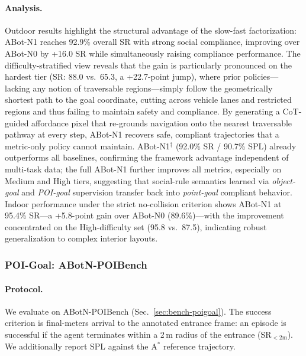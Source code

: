 \paragraph{Analysis.}
Outdoor results highlight the structural advantage of the
slow-fast factorization: ABot-N1 reaches 92.9\% overall SR with
strong social compliance, improving over ABot-N0
by +16.0 SR while simultaneously raising compliance performance.
The difficulty-stratified view reveals that the gain is particularly
pronounced on the hardest tier (SR: 88.0 vs.\ 65.3, a +22.7-point
jump), where prior policies---lacking any notion of traversable
regions---simply follow the geometrically shortest path to the goal
coordinate, cutting across vehicle lanes and restricted regions and
thus failing to maintain safety and compliance.
By generating a CoT-guided affordance pixel that re-grounds
navigation onto the nearest traversable pathway at every step,
ABot-N1 recovers safe, compliant trajectories that a metric-only
policy cannot maintain.
ABot-N1$^\dagger$ (92.0\% SR / 90.7\% SPL) already outperforms
all baselines, confirming the framework advantage independent of
multi-task data; the full ABot-N1 further improves all metrics,
especially on Medium and High tiers, suggesting that social-rule
semantics learned via \textit{object-goal} and \textit{POI-goal} supervision transfer
back into \textit{point-goal} compliant behavior.
Indoor performance under the strict no-collision criterion
shows ABot-N1 at 95.4\% SR---a +5.8-point gain over ABot-N0
(89.6\%)---with the improvement concentrated on the High-difficulty
set (95.8 vs.\ 87.5), indicating robust generalization to complex
interior layouts.

\FloatBarrier
\subsubsection{POI-Goal: ABotN-POIBench}
\label{sec:exp-poigoal}

\paragraph{Protocol.}
We evaluate on ABotN-POIBench (Sec.~\ref{sec:bench-poigoal}). The
success criterion is final-meters arrival to the annotated
entrance frame: an episode is successful if the agent terminates
within a 2\,m radius of the entrance (SR$_{<2\mathrm{m}}$). We
additionally report SPL against the A$^{\!*}$ reference
trajectory.

